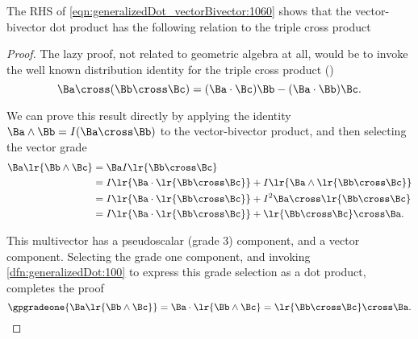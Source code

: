 The RHS of \cref{eqn:generalizedDot_vectorBivector:1060} shows that the vector-bivector dot product has the following relation to the
 triple cross product

\begin{proof}
The lazy proof, not related to geometric algebra at all, would be to invoke the well known
distribution identity for the triple cross product
(\citep{jackson1975cew})
\begin{equation}\label{eqn:generalizedDot_vectorBivector:1100}
\Ba \cross ( \Bb \cross \Bc ) = (\Ba \cdot \Bc) \Bb - (\Ba \cdot \Bb) \Bc.
\end{equation}

We can prove this result directly by applying the identity \( \Ba \wedge \Bb = I ( \Ba \cross \Bb ) \) to the vector-bivector product, and then selecting the vector grade
\begin{equation}\label{eqn:generalizedDot_vectorBivector:1000}
\begin{aligned}
\Ba \lr{ \Bb \wedge \Bc }
&= \Ba I \lr{ \Bb \cross \Bc } \\
&=
I \lr{ \Ba \cdot \lr{ \Bb \cross \Bc } }
+
I \lr{ \Ba \wedge \lr{ \Bb \cross \Bc } } \\
&=
I \lr{ \Ba \cdot \lr{ \Bb \cross \Bc } }
+
I^2 \Ba \cross \lr{ \Bb \cross \Bc } \\
&=
I \lr{ \Ba \cdot \lr{ \Bb \cross \Bc } }
+
\lr{ \Bb \cross \Bc } \cross \Ba.
\end{aligned}
\end{equation}

This multivector has a pseudoscalar (grade 3) component, and a vector component.  Selecting the grade one component,
and invoking \cref{dfn:generalizedDot:100} to express this grade selection as a dot product, completes the proof
\begin{equation}\label{eqn:generalizedDot_vectorBivector:1080}
\gpgradeone{ \Ba \lr{ \Bb \wedge \Bc } }
=
\Ba \cdot \lr{ \Bb \wedge \Bc }
=
\lr{ \Bb \cross \Bc } \cross \Ba.
\end{equation}
\end{proof}
